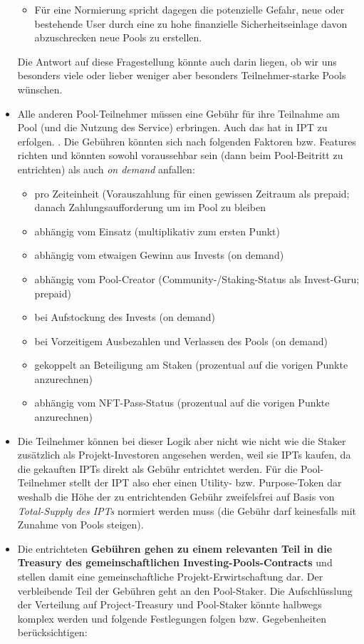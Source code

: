 \begin{itemize}
\begin{itemize}
		\item Für eine Normierung spricht dagegen die potenzielle Gefahr, neue oder bestehende User durch eine zu hohe finanzielle Sicherheitseinlage davon abzuschrecken neue Pools zu erstellen.
	\end{itemize}
	Die Antwort auf diese Fragestellung könnte auch darin liegen, ob wir uns besonders viele oder lieber weniger aber besonders Teilnehmer-starke Pools wünschen.	
	\item Alle anderen Pool-Teilnehmer müssen eine Gebühr für ihre Teilnahme am Pool (und die Nutzung des Service) erbringen. Auch das hat in IPT zu erfolgen. . Die Gebühren könnten sich nach folgenden Faktoren bzw. Features richten und könnten sowohl voraussehbar sein (dann beim Pool-Beitritt zu entrichten) als auch \textit{on demand} anfallen:
	\begin{itemize}
		\item pro Zeiteinheit (Vorauszahlung für einen gewissen Zeitraum als prepaid; danach Zahlungsaufforderung um im Pool zu bleiben
		\item abhängig vom Einsatz (multiplikativ zum ersten Punkt)
		\item abhängig vom etwaigen Gewinn aus Invests (on demand)
		\item abhängig vom Pool-Creator (Community-/Staking-Status als Invest-Guru; prepaid)
		\item bei Aufstockung des Invests (on demand)
		\item bei Vorzeitigem Ausbezahlen und Verlassen des Pools (on demand)
		\item gekoppelt an Beteiligung am Staken (prozentual auf die vorigen Punkte anzurechnen)
		\item abhängig vom NFT-Pass-Status (prozentual auf die vorigen Punkte anzurechnen)
	\end{itemize} 
	\item Die Teilnehmer können bei dieser Logik aber nicht wie nicht wie die Staker zusätzlich als Projekt-Investoren angesehen werden, weil sie IPTs kaufen, da die gekauften IPTs direkt als Gebühr entrichtet werden. Für die Pool-Teilnehmer stellt der IPT also eher einen Utility- bzw. Purpose-Token dar weshalb die Höhe der zu entrichtenden Gebühr zweifelsfrei auf Basis von \textit{Total-Supply des IPTs} normiert werden muss (die Gebühr darf keinesfalls mit Zunahme von Pools steigen).
	\item Die entrichteten \textbf{Gebühren gehen zu einem relevanten Teil in die Treasury des gemeinschaftlichen Investing-Pools-Contracts} und stellen damit eine gemeinschaftliche Projekt-Erwirtschaftung dar. Der verbleibende Teil der Gebühren geht an den Pool-Staker. Die Aufschlüsslung der Verteilung auf Project-Treasury und Pool-Staker könnte halbwegs komplex werden und folgende Festlegungen folgen bzw. Gegebenheiten berücksichtigen:

\end{itemize}
